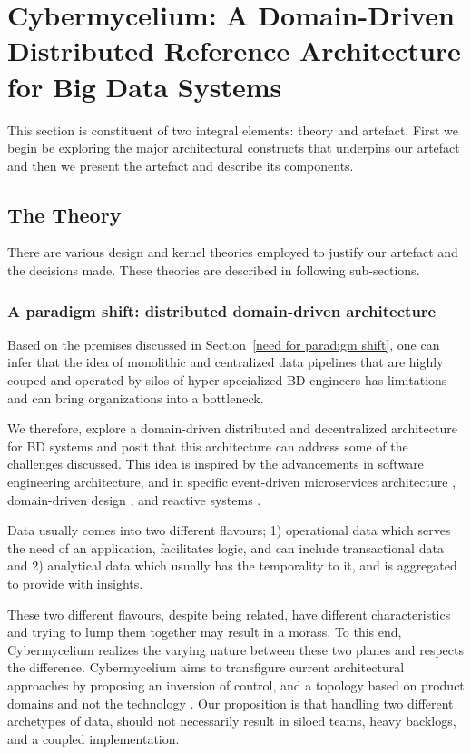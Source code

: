 \documentclass{bmcart}
\begin{document}
\section{Cybermycelium: A Domain-Driven Distributed Reference Architecture for Big Data Systems} \label{artifact-section}

This section is constituent of two integral elements: theory and artefact. First we begin be exploring the major architectural constructs that underpins our artefact and then we present the artefact and describe its components.

\subsection{The Theory}

There are various design and kernel theories employed to justify our artefact and the decisions made. These theories are described in following sub-sections.

\subsubsection{A paradigm shift: distributed domain-driven architecture}

Based on the premises discussed in Section~\ref{need for paradigm shift}, one can infer that the idea of monolithic and centralized data pipelines that are highly couped and operated by silos of hyper-specialized BD engineers has limitations and can bring organizations into a bottleneck.

We therefore, explore a domain-driven distributed and decentralized architecture for BD systems and posit that this architecture can address some of the challenges discussed. This idea is inspired by the advancements in software engineering architecture, and in specific event-driven microservices architecture \cite{EventDrivenMicroServices}, domain-driven design \cite{evans2004domain}, and reactive systems \cite{aceto2007reactive}.

Data usually comes into two different flavours; 1) operational data which serves the need of an application, facilitates logic, and can include transactional data and 2) analytical data which usually has the temporality to it, and is aggregated to provide with insights.

These two different flavours, despite being related, have different characteristics and trying to lump them together may result in a morass. To this end, Cybermycelium realizes the varying nature between these two planes and respects the difference. Cybermycelium aims to transfigure current architectural approaches by proposing an inversion of control, and a topology based on product domains and not the technology \cite{dataMeshArticle}. Our proposition is that handling two different archetypes of data, should not necessarily result in siloed teams, heavy backlogs, and a coupled implementation.
\end{document}
